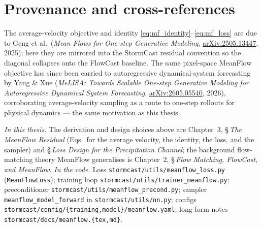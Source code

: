 \documentclass[11pt]{article}
\newcommand{\code}[1]{\texttt{#1}}
\begin{document}
\section*{Provenance and cross-references}

The average-velocity objective and identity
\eqref{eq:mf_identity}--\eqref{eq:mf_loss} are due to Geng et al.\ (\emph{Mean
Flows for One-step Generative Modeling},
\href{https://arxiv.org/abs/2505.13447}{arXiv:2505.13447}, 2025); here they are
mirrored into the StormCast residual convention so the diagonal collapses onto
the FlowCast baseline. The same pixel-space MeanFlow objective has since been
carried to autoregressive dynamical-system forecasting by Yang \& Xue (\emph{MeLISA:
Towards Scalable One-step Generative Modeling for Autoregressive Dynamical System
Forecasting}, \href{https://arxiv.org/abs/2605.05540}{arXiv:2605.05540}, 2026),
corroborating average-velocity sampling as a route to one-step rollouts for
physical dynamics --- the same motivation as this thesis.

\smallskip
\noindent\textit{In this thesis.} The derivation and design choices above are
Chapter~3, \S\,\emph{The MeanFlow Residual} (Eqs.~for the average velocity, the
identity, the loss, and the sampler) and \S\,\emph{Loss Design for the
Precipitation Channel}; the background flow-matching theory MeanFlow generalises
is Chapter~2, \S\,\emph{Flow Matching, FlowCast, and MeanFlow}.
\textit{In the code.} Loss \code{stormcast/utils/meanflow\_loss.py}
(\code{MeanFlowLoss}); training loop \code{stormcast/utils/trainer\_meanflow.py};
preconditioner \code{stormcast/utils/meanflow\_precond.py}; sampler
\code{meanflow\_model\_forward} in \code{stormcast/utils/nn.py}; configs
\code{stormcast/config/\{training,model\}/meanflow.yaml}; long-form notes
\code{stormcast/docs/meanflow.\{tex,md\}}.
\end{document}
